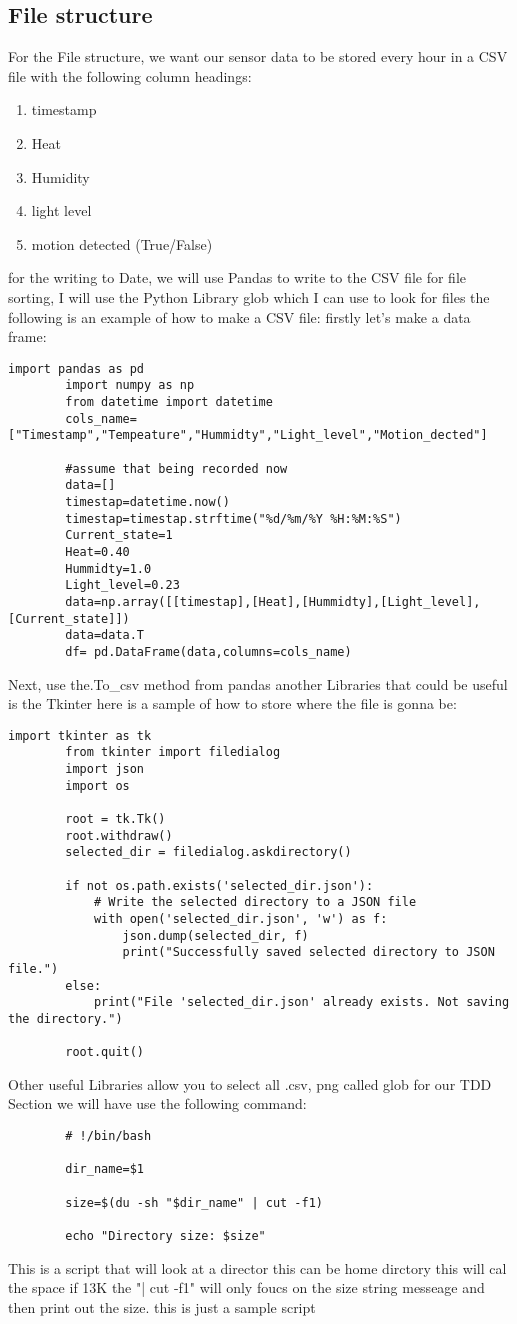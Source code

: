	\subsection{File structure}
	For the  File structure, we want our sensor data to be stored every hour in a  CSV file with the following column headings:
	\begin{enumerate}
		\item timestamp
		\item Heat
		\item Humidity
		\item light level
		\item motion detected (True/False)
	\end{enumerate}
	for the writing to Date, we will use Pandas to write to the CSV file
	for file sorting, I will use the Python Library glob  which I can use  to look for  files 
	the following is an example of how  to  make a CSV file:
	firstly let's make a data frame:
	\begin{lstlisting}[style=mystyle,caption={sample code for turning sensor data into a data}]
		import pandas as pd
		import numpy as np
		from datetime import datetime
		cols_name=["Timestamp","Tempeature","Hummidty","Light_level","Motion_dected"]

		#assume that being recorded now
		data=[]
		timestap=datetime.now()
		timestap=timestap.strftime("%d/%m/%Y %H:%M:%S")
		Current_state=1
		Heat=0.40
		Hummidty=1.0
		Light_level=0.23
		data=np.array([[timestap],[Heat],[Hummidty],[Light_level],[Current_state]])
		data=data.T
		df= pd.DataFrame(data,columns=cols_name)
	\end{lstlisting}
	Next, use the.To\_csv method from  pandas
	another Libraries that could  be useful is the Tkinter
	here is a  sample of how to   store where the  file is  gonna be:
	\begin{lstlisting}[style=mystyle,caption={example code for storing directory}]
		import tkinter as tk
		from tkinter import filedialog
		import json
		import os

		root = tk.Tk()
		root.withdraw()
		selected_dir = filedialog.askdirectory()

		if not os.path.exists('selected_dir.json'):
			# Write the selected directory to a JSON file
			with open('selected_dir.json', 'w') as f:
				json.dump(selected_dir, f)
				print("Successfully saved selected directory to JSON file.")
		else:
			print("File 'selected_dir.json' already exists. Not saving the directory.")

		root.quit()
	\end{lstlisting}
	Other useful Libraries allow you to  select all  .csv, png  called glob
	for our TDD Section we will have  use the  following command:
	\label{TDD sample bash}
	\begin{verbatim}
		# !/bin/bash

		dir_name=$1

		size=$(du -sh "$dir_name" | cut -f1)

		echo "Directory size: $size"
	\end{verbatim}
	This is a script that will look at a  director this can be home dirctory  this will cal the  space if 13K
	the "| cut -f1" will only foucs on the  size string messeage and then print out the  size. this is  just  a sample  script 
